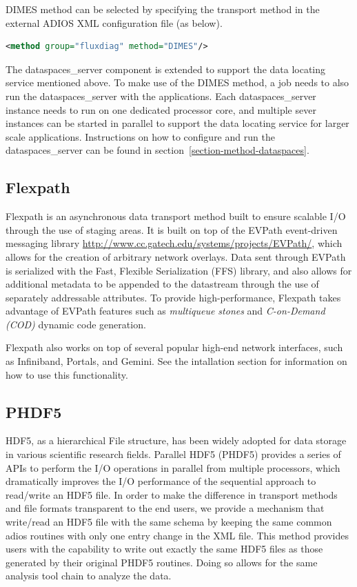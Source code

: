 DIMES method can be selected by specifying the transport method in the external 
ADIOS XML configuration file (as below).

\begin{lstlisting}[language=XML, caption=Select DIMES as a transport method in the configuration file example.]
<method group="fluxdiag" method="DIMES"/>
\end{lstlisting}

The dataspaces\_server component is extended to support the data locating service 
mentioned above. To make use of the DIMES method, a job needs to also run the 
dataspaces\_server with the applications. Each dataspaces\_server instance 
needs to run on one dedicated processor core, and multiple sever instances can be 
started in parallel to support the data locating service for larger scale applications. 
Instructions on how to configure and run the dataspaces\_server can be found in 
section~\ref{section-method-dataspaces}.


\subsection{Flexpath}
\label{section-method-flexpath}
Flexpath is an asynchronous data transport method built to ensure scalable I/O through the use of staging areas. It is built on top of the EVPath event-driven messaging library \url{http://www.cc.gatech.edu/systems/projects/EVPath/}, which allows for the creation of arbitrary network overlays. Data sent through EVPath is serialized with the Fast, Flexible Serialization (FFS) library, and also allows for additional metadata to be appended to the datastream through the use of separately addressable attributes. To provide high-performance, Flexpath takes advantage of EVPath features such as {\em multiqueue stones} and {\em C-on-Demand (COD)} dynamic code generation.

Flexpath also works on top of several popular high-end network interfaces, such as Infiniband, Portals, and Gemini. See the intallation section for information on how to use this functionality. 


\subsection{PHDF5}

HDF5, as a hierarchical File structure, has been widely adopted for data storage 
in various scientific research fields.  Parallel HDF5 (PHDF5) provides a series 
of APIs to perform the I/O operations in parallel from multiple processors, which 
dramatically improves the I/O performance of the sequential approach to read/write 
an HDF5 file. In order to make the difference in transport methods and file formats 
transparent to the end users, we provide a mechanism that write/read an HDF5 file 
with the same schema by keeping the same common adios routines with only one entry 
change in the XML file. This method provides users with the capability to write 
out exactly the same HDF5 files as those generated by their original PHDF5 routines. 
Doing so allows for the same analysis tool chain to analyze the data. 

